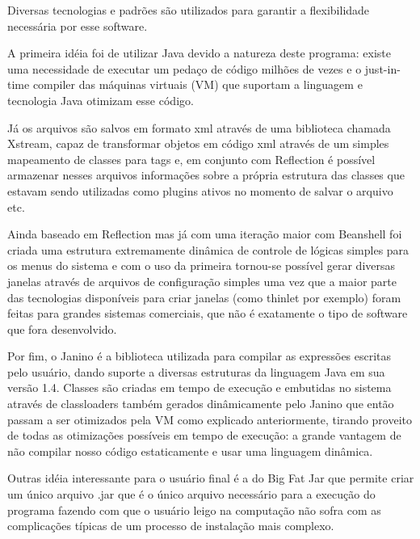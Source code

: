 \documentclass[12pt,twoside]{article}
\begin{document}
{
Diversas tecnologias e padr\~oes s\~ao utilizados para garantir a
flexibilidade necess\'aria por esse software.}

{
 A primeira id\'eia foi de utilizar Java devido a natureza deste
programa: existe uma necessidade de executar um peda\c{c}o de c\'odigo
milh\~oes de vezes e o just{}-in{}-time compiler das m\'aquinas
virtuais (VM) que suportam a linguagem e tecnologia Java otimizam esse
c\'odigo.}

{
 J\'a os arquivos s\~ao salvos em formato xml atrav\'es de uma
biblioteca chamada Xstream, capaz de transformar objetos em c\'odigo
xml atrav\'es de um simples mapeamento de classes para tags e, em
conjunto com Reflection \'e poss\'ivel armazenar nesses arquivos
informa\c{c}\~oes sobre a pr\'opria estrutura das classes que estavam
sendo utilizadas como plugins ativos no momento de salvar o arquivo
etc.}

{
 Ainda baseado em Reflection mas j\'a com uma itera\c{c}\~ao maior com
Beanshell foi criada uma estrutura extremamente din\^amica de controle
de l\'ogicas simples para os menus do sistema e com o uso da primeira
tornou{}-se poss\'ivel gerar diversas janelas atrav\'es de arquivos de
configura\c{c}\~ao simples uma vez que a maior parte das tecnologias
dispon\'iveis para criar janelas (como thinlet por exemplo) foram
feitas para grandes sistemas comerciais, que n\~ao \'e exatamente o
tipo de software que fora desenvolvido.}

{
 Por fim, o Janino \'e a biblioteca utilizada para compilar as
express\~oes escritas pelo usu\'ario, dando suporte a diversas
estruturas da linguagem Java em sua vers\~ao 1.4. Classes s\~ao criadas
em tempo de execu\c{c}\~ao e embutidas no sistema atrav\'es de
classloaders tamb\'em gerados din\^amicamente pelo Janino que ent\~ao
passam a ser otimizados pela VM como explicado anteriormente, tirando
proveito de todas as otimiza\c{c}\~oes poss\'iveis em tempo de
execu\c{c}\~ao: a grande vantagem de n\~ao compilar nosso c\'odigo
estaticamente e usar uma linguagem din\^amica.}

{
 Outras id\'eia interessante para o usu\'ario final \'e a do Big Fat Jar
que permite criar um \'unico arquivo .jar que \'e o \'unico arquivo
necess\'ario para a execu\c{c}\~ao do programa fazendo com que o
usu\'ario leigo na computa\c{c}\~ao n\~ao sofra com as
complica\c{c}\~oes t\'ipicas de um processo de instala\c{c}\~ao mais
complexo.}
\end{document}
